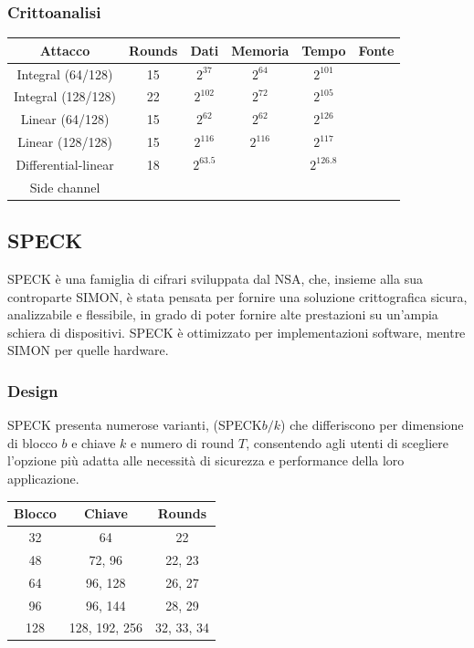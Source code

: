 \documentclass[target=bach,aauheader=,style=]{thud}
\begin{document}
			\subsubsection{Crittoanalisi}
			\begin{center}
				\begin{tabular}{ |c|c|c|c|c|c| } 
					\hline
					Attacco & Rounds & Dati & Memoria & Tempo & Fonte \\ 
					\hline 
					\hline
					Integral (64/128) & 15 & $2^{37}$ & $2^{64}$ & $2^{101}$ & \cite{sparx}\\
					\hline
					Integral (128/128) & 22 & $2^{102}$ & $2^{72}$ & $2^{105}$ & \cite{sparx}\\
					\hline
					Linear (64/128) & 15 & $2^{62}$ & $2^{62}$ & $2^{126}$ & \cite{sparxlinear}\\
					\hline
					Linear (128/128) & 15 & $2^{116}$ & $2^{116}$ & $2^{117}$ & \cite{sparxlinear}\\
					\hline
					Differential-linear & 18 & $2^{63.5}$ & & $2^{126.8}$ & \cite{sparxdifflin} \\
					\hline
					Side channel & & & & &  \cite{sparxside}\\
					\hline
				\end{tabular}
			\end{center}
		\subsection{SPECK}
		SPECK è una famiglia di cifrari sviluppata dal NSA, che, insieme alla sua controparte SIMON, è stata pensata per fornire una soluzione crittografica sicura, analizzabile e flessibile, in grado di poter fornire alte prestazioni su un'ampia schiera di dispositivi. SPECK è ottimizzato per implementazioni software, mentre SIMON per quelle hardware\cite{speck}.
			\subsubsection{Design}
			SPECK presenta numerose varianti, (SPECK$b/k$) che differiscono per dimensione di blocco $b$ e chiave $k$ e numero di round $T$, consentendo agli utenti di scegliere l'opzione più adatta alle necessità di sicurezza e performance della loro applicazione.\\
			\begin{center}
				\begin{tabular}{ |c|c|c| } 
					\hline
					\textbf{Blocco} & \textbf{Chiave} & \textbf{Rounds} \\ 
					\hline 
					\hline
					32 & 64 & 22\\
					\hline
					48 & 72, 96 & 22, 23\\
					\hline
					64 & 96, 128 & 26, 27\\
					\hline
					96 & 96, 144 & 28, 29\\
					\hline
					128 & 128, 192, 256 & 32, 33, 34\\
					\hline
				\end{tabular}
			\end{center}
			
\end{document}

